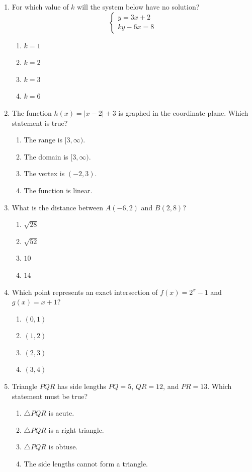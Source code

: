 \documentclass[11pt]{article}
\begin{document}
\begin{enumerate}
\item For which value of $k$ will the system below have no solution?
\[
\begin{cases}
y=3x+2\\
ky-6x=8
\end{cases}
\]
\begin{enumerate}[label=(\Alph*)]
\item $k=1$ \item $k=2$ \item $k=3$ \item $k=6$
\end{enumerate}

\newpage
\item The function $h(x)=|x-2|+3$ is graphed in the coordinate plane. Which statement is true?
\begin{enumerate}[label=(\Alph*)]
\item The range is $[3,\infty)$.
\item The domain is $[3,\infty)$.
\item The vertex is $(-2,3)$.
\item The function is linear.
\end{enumerate}

\item What is the distance between $A(-6,2)$ and $B(2,8)$?
\begin{enumerate}[label=(\Alph*)]
\item $\sqrt{28}$ \item $\sqrt{52}$ \item $10$ \item $14$
\end{enumerate}

\item Which point represents an exact intersection of $f(x)=2^x-1$ and $g(x)=x+1$?
\begin{enumerate}[label=(\Alph*)]
\item $(0,1)$
\item $(1,2)$
\item $(2,3)$
\item $(3,4)$
\end{enumerate}

\item Triangle $PQR$ has side lengths $PQ=5$, $QR=12$, and $PR=13$. Which statement must be true?
\begin{enumerate}[label=(\Alph*)]
\item $\triangle PQR$ is acute.
\item $\triangle PQR$ is a right triangle.
\item $\triangle PQR$ is obtuse.
\item The side lengths cannot form a triangle.
\end{enumerate}
\end{enumerate}
\end{document}
